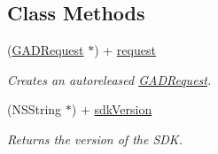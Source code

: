 \subsection*{Class Methods}
\begin{DoxyCompactItemize}
\item 
\mbox{\label{interfaceGADRequest_a372d0670c7d8d19fef03fd9cffc17c62}} 
(\hyperlink{interfaceGADRequest}{G\+A\+D\+Request} $\ast$) + \hyperlink{interfaceGADRequest_a372d0670c7d8d19fef03fd9cffc17c62}{request}
\begin{DoxyCompactList}\small\item\em Creates an autoreleased \hyperlink{interfaceGADRequest}{G\+A\+D\+Request}. \end{DoxyCompactList}\item 
\mbox{\label{interfaceGADRequest_aa6b142d1f041a191252be40f68259b36}} 
(N\+S\+String $\ast$) + \hyperlink{interfaceGADRequest_aa6b142d1f041a191252be40f68259b36}{sdk\+Version}
\begin{DoxyCompactList}\small\item\em Returns the version of the S\+DK. \end{DoxyCompactList}\end{DoxyCompactItemize}
